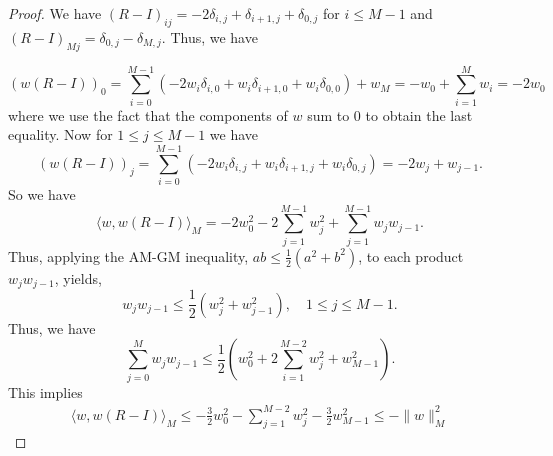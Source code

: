 \documentclass[12pt]{amsart}
\theoremstyle{definition}
\theoremstyle{remark}
\begin{document}
\begin{proof}
    We have $(R-I)_{ij} = -2\delta_{i,j} +\delta_{i+1,j}+\delta_{0,j}$ for  $i\le M-1$ and $(R-I)_{Mj}=\delta_{0,j} -\delta_{M,j}$. Thus, we have 

    \[
    (w(R- I))_0 = \sum_{i=0}^{M-1}(-2w_i\delta_{i,0} + w_i\delta_{i+1,0}+w_i\delta_{0,0}) +w_M = -w_0+\sum_{i=1}^Mw_i =-2w_0
    \]
    where we use the fact that the components of $w$ sum to 0 to obtain the last equality. Now for $1\le j\le M-1$ we have 
    \[
    (w(R- I))_j = \sum_{i=0}^{M-1}(-2w_i\delta_{i,j} + w_i\delta_{i+1,j}+w_i\delta_{0,j})  = -2w_j+w_{j-1}.
    \]
    So we have 
    \[
    \langle w, w(R- I)\rangle_M = -2w_0^2 -2 \sum_{j=1}^{M-1}w_j^2 +  \sum_{j=1}^{M-1}w_{j}w_{j-1}. 
    \]
Thus, applying the AM-GM inequality, $ab \leq \frac{1}{2}(a^2 + b^2)$, to each product $w_jw_{j-1}$, yields,
\[
w_jw_{j-1} \leq \frac{1}{2}(w_j^2 + w_{j-1}^2), \quad 1 \leq j \leq M-1.
\]
Thus, we have 
\[
 \sum_{j=0}^{M}w_{j}w_{j-1} \leq \frac{1}{2}\left(w_0^2 + 2\sum_{i=1}^{M-2}w_j^2 + w_{M-1}^2\right).
\]
This implies 
\begin{align*}
\langle w, w(R- I)\rangle_M \leq -\frac{3}{2}w_0^2 - \sum_{j=1}^{M-2}w_j^2  -\frac{3}{2}w_{M-1}^2\le-\|w\|_M^2
\end{align*}
\end{proof}
\end{document}
